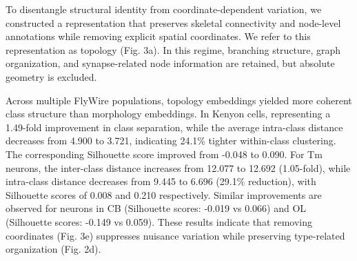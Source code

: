\documentclass{article}
\begin{document}
To disentangle structural identity from coordinate-dependent variation, we constructed a representation that preserves skeletal connectivity and node-level annotations while removing explicit spatial coordinates. We refer to this representation as topology (Fig. 3a). In this regime, branching structure, graph organization, and synapse-related node information are retained, but absolute geometry is excluded.

Across multiple FlyWire populations, topology embeddings yielded more coherent class structure than morphology embeddings. In Kenyon cells, representing a 1.49-fold improvement in class separation, while the average intra-class distance decreases from 4.900 to 3.721, indicating 24.1\% tighter within-class clustering. The corresponding Silhouette score improved from -0.048 to 0.090. For Tm neurons, the inter-class distance increases from 12.077 to 12.692 (1.05-fold), while intra-class distance decreases from 9.445 to 6.696 (29.1\% reduction), with Silhouette scores of 0.008 and 0.210 respectively. Similar improvements are observed for neurons in CB (Silhouette scores: -0.019 vs 0.066) and OL (Silhouette scores: -0.149 vs 0.059). These results indicate that removing coordinates (Fig. 3e) suppresses nuisance variation while preserving type-related organization (Fig. 2d).
\end{document}
